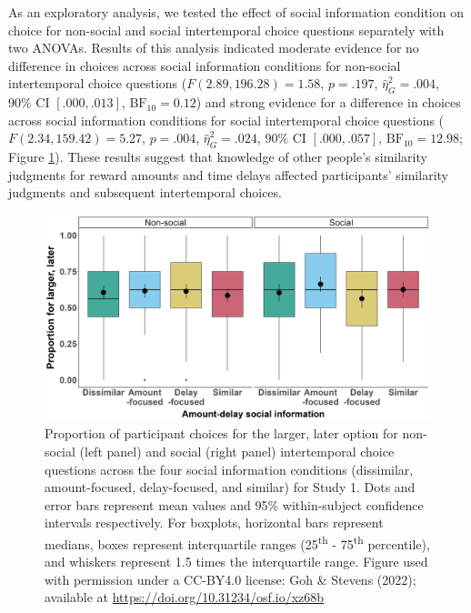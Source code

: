\documentclass[
  pub,floatsintext]{apa6}
\begin{document}
As an exploratory analysis, we tested the effect of social information condition on choice for non-social and social intertemporal choice questions separately with two ANOVAs. Results of this analysis indicated moderate evidence for no difference in choices across social information conditions for non-social intertemporal choice questions (\(F(2.89, 196.28) = 1.58\), \(p = .197\), \(\hat{\eta}^2_G = .004\), 90\% CI \([.000, .013]\), \(\mathrm{BF}_{\textrm{10}} = 0.12\)) and strong evidence for a difference in choices across social information conditions for social intertemporal choice questions (\(F(2.34, 159.42) = 5.27\), \(p = .004\), \(\hat{\eta}^2_G = .024\), 90\% CI \([.000, .057]\), \(\mathrm{BF}_{\textrm{10}} = 12.98\); Figure \ref{fig:socialinfoitc1}). These results suggest that knowledge of other people's similarity judgments for reward amounts and time delays affected participants' similarity judgments and subsequent intertemporal choices.



\begin{figure}

{\centering \includegraphics[width=0.8\linewidth]{figures/itc_social_info_1} 

}

\caption{Proportion of participant choices for the larger, later option for non-social (left panel) and social (right panel) intertemporal choice questions across the four social information conditions (dissimilar, amount-focused, delay-focused, and similar) for Study 1. Dots and error bars represent mean values and 95\% within-subject confidence intervals respectively. For boxplots, horizontal bars represent medians, boxes represent interquartile ranges (25\textsuperscript{th} - 75\textsuperscript{th} percentile), and whiskers represent 1.5 times the interquartile range. Figure used with permission under a CC-BY4.0 license: Goh \& Stevens (2022); available at \url{https://doi.org/10.31234/osf.io/xz68b}}\label{fig:socialinfoitc1}
\end{figure}
\end{document}
